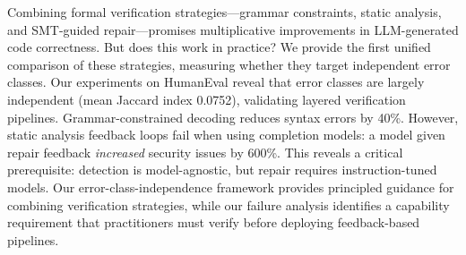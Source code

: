 Combining formal verification strategies---grammar constraints, static analysis, and SMT-guided repair---promises multiplicative improvements in LLM-generated code correctness. But does this work in practice? We provide the first unified comparison of these strategies, measuring whether they target independent error classes. Our experiments on HumanEval reveal that error classes are largely independent (mean Jaccard index 0.0752), validating layered verification pipelines. Grammar-constrained decoding reduces syntax errors by 40\%. However, static analysis feedback loops fail when using completion models: a model given repair feedback \emph{increased} security issues by 600\%. This reveals a critical prerequisite: detection is model-agnostic, but repair requires instruction-tuned models. Our error-class-independence framework provides principled guidance for combining verification strategies, while our failure analysis identifies a capability requirement that practitioners must verify before deploying feedback-based pipelines.
